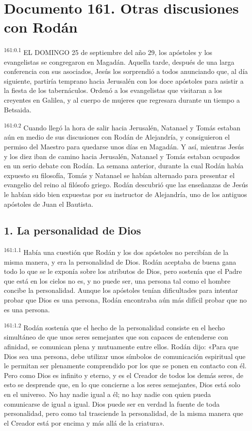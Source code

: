 \chapter{Documento 161. Otras discusiones con Rodán}
\par
\textsuperscript{161:0.1} EL DOMINGO 25 de septiembre del año 29, los apóstoles y los evangelistas se congregaron en Magadán. Aquella tarde, después de una larga conferencia con sus asociados, Jesús los sorprendió a todos anunciando que, al día siguiente, partiría temprano hacia Jerusalén con los doce apóstoles para asistir a la fiesta de los tabernáculos. Ordenó a los evangelistas que visitaran a los creyentes en Galilea, y al cuerpo de mujeres que regresara durante un tiempo a Betsaida.

\par
\textsuperscript{161:0.2} Cuando llegó la hora de salir hacia Jerusalén, Natanael y Tomás estaban aún en medio de sus discusiones con Rodán de Alejandría, y consiguieron el permiso del Maestro para quedarse unos días en Magadán. Y así, mientras Jesús y los diez iban de camino hacia Jerusalén, Natanael y Tomás estaban ocupados en un serio debate con Rodán. La semana anterior, durante la cual Rodán había expuesto su filosofía, Tomás y Natanael se habían alternado para presentar el evangelio del reino al filósofo griego. Rodán descubrió que las enseñanzas de Jesús le habían sido bien expuestas por su instructor de Alejandría, uno de los antiguos apóstoles de Juan el Bautista.

\section*{1. La personalidad de Dios}
\par
\textsuperscript{161:1.1} Había una cuestión que Rodán y los dos apóstoles no percibían de la misma manera, y era la personalidad de Dios. Rodán aceptaba de buena gana todo lo que se le exponía sobre los atributos de Dios, pero sostenía que el Padre que está en los cielos no es, y no puede ser, una persona tal como el hombre concibe la personalidad. Aunque los apóstoles tenían dificultades para intentar probar que Dios es una persona, Rodán encontraba aún más difícil probar que no es una persona.

\par
\textsuperscript{161:1.2} Rodán sostenía que el hecho de la personalidad consiste en el hecho simultáneo de que unos seres semejantes que son capaces de entenderse con afinidad, se comunican plena y mutuamente entre ellos. Rodán dijo: «Para que Dios sea una persona, debe utilizar unos símbolos de comunicación espiritual que le permitan ser plenamente comprendido por los que se ponen en contacto con él. Pero como Dios es infinito y eterno, y es el Creador de todos los demás seres, de esto se desprende que, en lo que concierne a los seres semejantes, Dios está solo en el universo. No hay nadie igual a él; no hay nadie con quien pueda comunicarse de igual a igual. Dios puede ser en verdad la fuente de toda personalidad, pero como tal trasciende la personalidad, de la misma manera que el Creador está por encima y más allá de la criatura».

